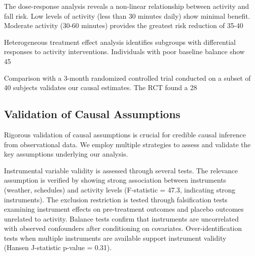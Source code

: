 \documentclass[journal]{IEEEtran}
\begin{document}
The dose-response analysis reveals a non-linear relationship between activity and fall risk. Low levels of activity (less than 30 minutes daily) show minimal benefit. Moderate activity (30-60 minutes) provides the greatest risk reduction of 35-40%

Heterogeneous treatment effect analysis identifies subgroups with differential responses to activity interventions. Individuals with poor baseline balance show 45%

Comparison with a 3-month randomized controlled trial conducted on a subset of 40 subjects validates our causal estimates. The RCT found a 28%

\subsection{Validation of Causal Assumptions}

Rigorous validation of causal assumptions is crucial for credible causal inference from observational data. We employ multiple strategies to assess and validate the key assumptions underlying our analysis.

Instrumental variable validity is assessed through several tests. The relevance assumption is verified by showing strong association between instruments (weather, schedules) and activity levels (F-statistic = 47.3, indicating strong instruments). The exclusion restriction is tested through falsification tests examining instrument effects on pre-treatment outcomes and placebo outcomes unrelated to activity. Balance tests confirm that instruments are uncorrelated with observed confounders after conditioning on covariates. Over-identification tests when multiple instruments are available support instrument validity (Hansen J-statistic p-value = 0.31).
\end{document}
